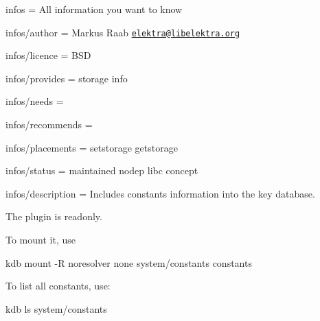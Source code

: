 
\begin{DoxyItemize}
\item infos = All information you want to know
\item infos/author = Markus Raab \href{mailto:elektra@libelektra.org}{\tt elektra@libelektra.\+org}
\item infos/licence = B\+S\+D
\item infos/provides = storage info
\item infos/needs =
\item infos/recommends =
\item infos/placements = setstorage getstorage
\item infos/status = maintained nodep libc concept
\item infos/description = Includes constants information into the key database.
\end{DoxyItemize}

The plugin is readonly.

To mount it, use \begin{DoxyVerb}    kdb mount -R noresolver none system/constants constants
\end{DoxyVerb}


To list all constants, use\+: \begin{DoxyVerb}    kdb ls system/constants\end{DoxyVerb}
 